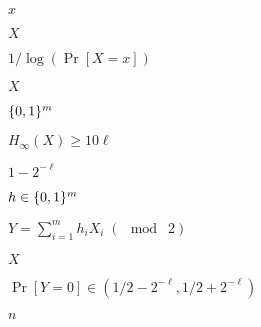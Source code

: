 \documentclass[10pt]{book}
\begin{document}
\begin{mdSnippets}
\begin{mdInlineSnippet}[9dd4e461268c8034f5c8564e155c67a6]%
$x$\end{mdInlineSnippet}%
\begin{mdInlineSnippet}[02129bb861061d1a052c592e2dc6b383]%
$X$\end{mdInlineSnippet}%
\begin{mdInlineSnippet}[6f7e89085abe1fd1f880eb0803e37b84]%
$1/\log(\Pr[X=x])$\end{mdInlineSnippet}%
\begin{mdInlineSnippet}[02129bb861061d1a052c592e2dc6b383]%
$X$\end{mdInlineSnippet}%
\begin{mdInlineSnippet}[c6243fb3783ab0fc4fd46bfe757401f4]%
$\{0,1\}^m$\end{mdInlineSnippet}%
\begin{mdInlineSnippet}%
$H_{\infty}(X) \geq 10\ell$\end{mdInlineSnippet}%
\begin{mdInlineSnippet}%
$1-2^{-\ell}$\end{mdInlineSnippet}%
\begin{mdInlineSnippet}[1d4b166302714f4ec37f6221ec7c6f4b]%
$h\in \{0,1\}^m$\end{mdInlineSnippet}%
\begin{mdInlineSnippet}%
$Y= \sum_{i=1}^m h_i X_i \; (\mod \; 2)$\end{mdInlineSnippet}%
\begin{mdInlineSnippet}[02129bb861061d1a052c592e2dc6b383]%
$X$\end{mdInlineSnippet}%
\begin{mdInlineSnippet}%
$\Pr[ Y= 0 ] \in (1/2 - 2^{-\ell}, 1/2 + 2^{-\ell})$\end{mdInlineSnippet}%
\begin{mdInlineSnippet}[7b8b965ad4bca0e41ab51de7b31363a1]%
$n$\end{mdInlineSnippet}%

\end{mdSnippets}
\end{document}

